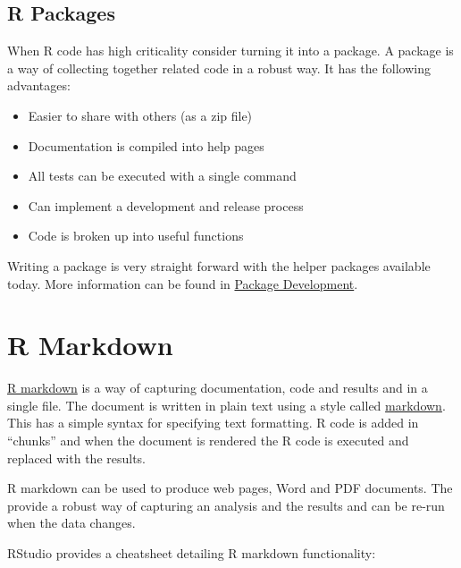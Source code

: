 \documentclass[]{book}
\providecommand{\tightlist}{%
  \setlength{\itemsep}{0pt}\setlength{\parskip}{0pt}}
\begin{document}
\hypertarget{r-packages}{%
\subsection{R Packages}\label{r-packages}}

When R code has high criticality consider turning it into a package. A package is a way
of collecting together related code in a robust way. It has the following advantages:

\begin{itemize}
\tightlist
\item
  Easier to share with others (as a zip file)
\item
  Documentation is compiled into help pages
\item
  All tests can be executed with a single command
\item
  Can implement a development and release process
\item
  Code is broken up into useful functions
\end{itemize}

Writing a package is very straight forward with the helper packages available today. More
information can be found in \href{development.html\#packages}{Package Development}.

\hypertarget{r-markdown}{%
\section{R Markdown}\label{r-markdown}}

\href{http://rmarkdown.rstudio.com/}{R markdown} is a way of capturing documentation, code and
results and in a single file. The document is written in plain text using a style called
\href{https://rmarkdown.rstudio.com/authoring_basics.html}{markdown}. This has a simple syntax
for specifying text formatting. R code is added in ``chunks'' and when the document is
rendered the R code is executed and replaced with the results.

R markdown can be used to produce web pages, Word and PDF documents. The provide a
robust way of capturing an analysis and the results and can be re-run when the data
changes.

RStudio provides a cheatsheet detailing R markdown functionality:
\end{document}
